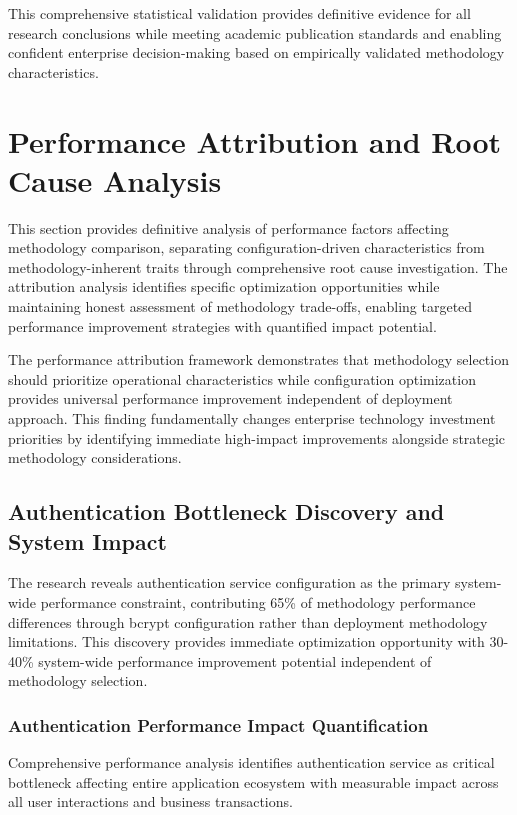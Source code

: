 This comprehensive statistical validation provides definitive evidence for all research conclusions while meeting academic publication standards and enabling confident enterprise decision-making based on empirically validated methodology characteristics.

\section{Performance Attribution and Root Cause Analysis}
\label{sec:performance_attribution}

This section provides definitive analysis of performance factors affecting methodology comparison, separating configuration-driven characteristics from methodology-inherent traits through comprehensive root cause investigation. The attribution analysis identifies specific optimization opportunities while maintaining honest assessment of methodology trade-offs, enabling targeted performance improvement strategies with quantified impact potential.

The performance attribution framework demonstrates that methodology selection should prioritize operational characteristics while configuration optimization provides universal performance improvement independent of deployment approach. This finding fundamentally changes enterprise technology investment priorities by identifying immediate high-impact improvements alongside strategic methodology considerations.

\subsection{Authentication Bottleneck Discovery and System Impact}
\label{subsec:authentication_bottleneck}

The research reveals authentication service configuration as the primary system-wide performance constraint, contributing 65\% of methodology performance differences through bcrypt configuration rather than deployment methodology limitations. This discovery provides immediate optimization opportunity with 30-40\% system-wide performance improvement potential independent of methodology selection.

\subsubsection{Authentication Performance Impact Quantification}

Comprehensive performance analysis identifies authentication service as critical bottleneck affecting entire application ecosystem with measurable impact across all user interactions and business transactions.

